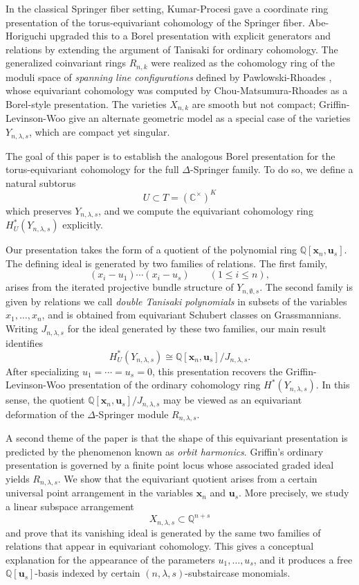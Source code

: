 \documentclass[11pt]{amsart}
\numberwithin{equation}{section}
\theoremstyle{definition}
\newcommand{\CC}{{\mathbb{C}}}
\newcommand{\QQ}{{\mathbb{Q}}}
\newcommand{\xxx}{{\mathbf{x}}}
\newcommand{\uuu}{{\mathbf{u}}}
\begin{document}
In the classical Springer fiber setting, Kumar-Procesi \cite{KumarProcesi2012} gave a coordinate ring presentation of the torus-equivariant cohomology of the Springer fiber. Abe-Horiguchi \cite{AH} upgraded this to a Borel presentation with explicit generators and relations by extending the argument of Tanisaki \cite{T} for ordinary cohomology. The generalized coinvariant rings $R_{n,k}$ were realized as the cohomology ring of the moduli space of \emph{spanning line configurations} defined by Pawlowski-Rhoades \cite{PawlowskiRhoades2019}, whose equivariant cohomology was computed by Chou-Matsumura-Rhoades \cite{CMR} as a Borel-style presentation. The varieties $X_{n,k}$ are smooth but not compact; Griffin-Levinson-Woo \cite{GLW} give an alternate geometric model as a special case of the varieties $Y_{n,\lambda,s}$, which are compact yet singular.

The goal of this paper is to establish the analogous Borel presentation for the torus-equivariant cohomology for the full
$\Delta$-Springer family. To do so, we define a natural subtorus
\[
U \subset T = (\CC^\times)^K
\]
which preserves $Y_{n,\lambda,s}$, and we compute the equivariant cohomology ring
$H_U^*(Y_{n,\lambda,s})$ explicitly.

Our presentation takes the form of a quotient of the polynomial ring
$\QQ[\xxx_n,\uuu_s]$. The defining ideal is generated by two families of
relations. The first family,
\[
(x_i-u_1)\cdots(x_i-u_s) \qquad (1 \leq i \leq n),
\]
arises from the iterated projective bundle structure of $Y_{n,\emptyset,s}$.
The second family is given by relations we call \emph{double Tanisaki polynomials} in subsets of the
variables $x_1,\dots,x_n$, and is obtained from equivariant Schubert classes on
Grassmannians. Writing $J_{n,\lambda,s}$ for the ideal generated by these two
families, our main result identifies
\[
H_U^*(Y_{n,\lambda,s}) \cong \QQ[\xxx_n,\uuu_s]/J_{n,\lambda,s}.
\]
After specializing $u_1=\cdots=u_s=0$, this presentation recovers the
Griffin-Levinson-Woo presentation of the ordinary cohomology ring
$H^*(Y_{n,\lambda,s})$. In this sense, the quotient
$\QQ[\xxx_n,\uuu_s]/J_{n,\lambda,s}$ may be viewed as an equivariant deformation
of the $\Delta$-Springer module $R_{n,\lambda,s}$.

A second theme of the paper is that the shape of this equivariant presentation is
predicted by the phenomenon known as \emph{orbit harmonics}. Griffin's ordinary presentation is governed by a
finite point locus whose associated graded ideal yields $R_{n,\lambda,s}$.
We show that the equivariant quotient arises from a certain universal point arrangement in
the variables $\xxx_n$ and $\uuu_s$. More precisely, we study a linear subspace
arrangement
\[
X_{n,\lambda,s} \subset \QQ^{n+s}
\]
and prove that its vanishing ideal is generated by the same two families of
relations that appear in equivariant cohomology. This gives a conceptual
explanation for the appearance of the parameters $u_1,\dots,u_s$, and it produces
a free $\QQ[\uuu_s]$-basis indexed by certain $(n,\lambda,s)$-substaircase monomials.
\end{document}
